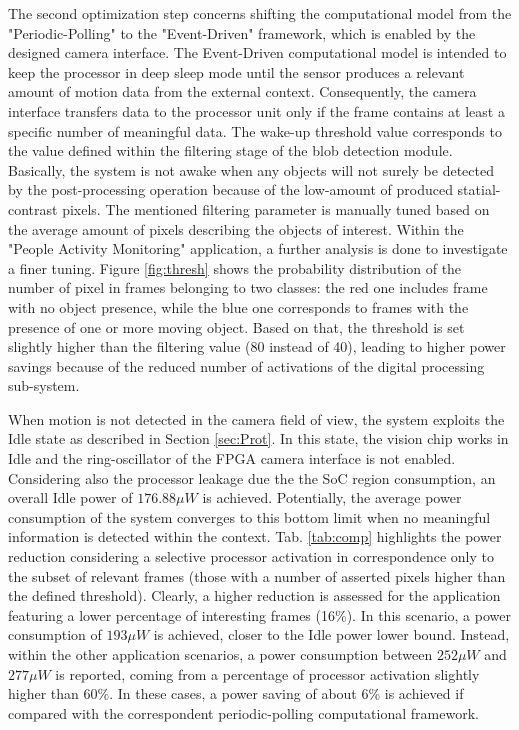 \documentclass[journal]{IEEEtran}
\begin{document}
The second optimization step concerns shifting the computational model from the "Periodic-Polling" to the  "Event-Driven" framework, which is enabled by the designed camera interface. The Event-Driven computational model is intended to keep the processor in deep sleep mode until the sensor produces a relevant amount of motion data from the external context.
Consequently, the camera interface transfers data to the processor unit only if the frame contains at least a specific number of meaningful data.
The wake-up threshold value corresponds to the value defined within the filtering stage of the blob detection module. Basically, the system is not awake when any objects will not surely be detected by the post-processing operation because of the low-amount of produced statial-contrast pixels.
The mentioned filtering parameter is manually tuned based on the average amount of pixels describing the objects of interest. Within the "People Activity Monitoring" application, a further analysis is done to investigate a finer tuning. Figure \ref{fig:thresh} shows the probability distribution of the number of pixel in frames belonging to two classes: the red one includes frame with no object presence, while the blue one corresponds to frames with the presence of one or more moving object. Based on that, the threshold is set slightly higher than the filtering value (80 instead of 40), leading to higher power savings because of the reduced number of activations of the digital processing sub-system.


When motion is not detected in the camera field of view, the system exploits the Idle state as described in Section \ref{sec:Prot}. In this state, the vision chip works in Idle and the ring-oscillator of the FPGA camera interface is not enabled. Considering also the processor leakage due the the SoC region consumption, an overall Idle power of $176.88\mu W$ is achieved. Potentially, the average power consumption of the system converges to this bottom limit when no meaningful information is detected within the context. Tab. \ref{tab:comp} highlights the power reduction considering a selective processor activation in correspondence only to the subset of relevant frames (those with a number of asserted pixels higher than the defined threshold). Clearly, a higher reduction is assessed for the application featuring a lower percentage of interesting frames (16\%). In this scenario, a power consumption of $193\mu W$ is achieved, closer to the Idle power lower bound. Instead, within the other application scenarios, a power consumption between $252\mu W$ and $277\mu W$ is reported, coming from a percentage of processor activation slightly higher than 60\%. In these cases, a power saving of about 6\% is achieved if compared with the correspondent periodic-polling computational framework. 
\end{document}
